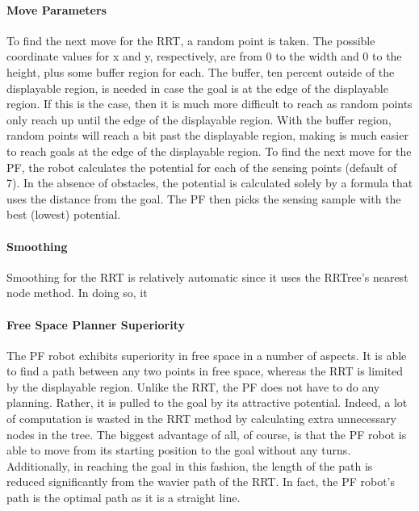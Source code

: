 \documentclass[12pt]{article}
\begin{document}
\paragraph*{Move Parameters}
To find the next move for the RRT, a random point is taken. The possible coordinate values for x and y, respectively, are from 0 to the width and 0 to the height, plus some buffer region for each. The buffer, ten percent outside of the displayable region, is needed in case the goal is at the edge of the displayable region. If this is the case, then it is much more difficult to reach as random points only reach up until the edge of the displayable region. With the buffer region, random points will reach a bit past the displayable region, making is much easier to reach goals at the edge of the displayable region.
To find the next move for the PF, the robot calculates the potential for each of the sensing points (default of 7). In the absence of obstacles, the potential is calculated solely by a formula that uses the distance from the goal. The PF then picks the sensing sample with the best (lowest) potential.

\paragraph*{Smoothing}
Smoothing for the RRT is relatively automatic since it uses the RRTree's nearest node method. In doing so, it 

\paragraph*{Free Space Planner Superiority}
The PF robot exhibits superiority in free space in a number of aspects. It is able to find a path between any two points in free space, whereas the RRT is limited by the displayable region. Unlike the RRT, the PF does not have to do any planning. Rather, it is pulled to the goal by its attractive potential. Indeed, a lot of computation is wasted in the RRT method by calculating extra unnecessary nodes in the tree. The biggest advantage of all, of course, is that the PF robot is able to move from its starting position to the goal without any turns. Additionally, in reaching the goal in this fashion, the length of the path is reduced significantly from the wavier path of the RRT. In fact, the PF robot's path is the optimal path as it is a straight line.
\end{document}
